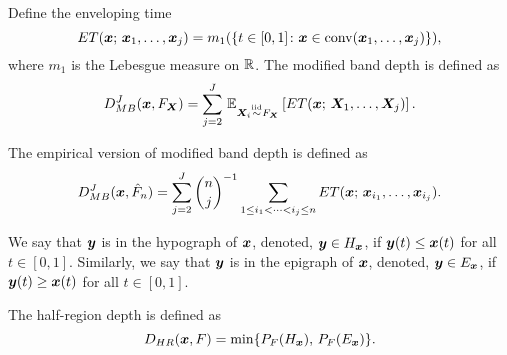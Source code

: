 \begin{definition}
    Define the enveloping time
    \begin{equation}
        ET(\bm{x};\, \bm{x}_1, \dots, \bm{x}_j) = m_1(\{t \in [0, 1]\colon \bm{x} \in \operatorname{conv}(\bm{x}_1, \dots, \bm{x}_j)\}),
    \end{equation}
    where $m_1$ is the Lebesgue measure on $\mathbb{R}$.
    The modified band depth is defined as
    \begin{equation}
        D_{MB}^J(\bm{x}, F_{\bm{X}}) = \sum_{j = 2}^J\, \operatorname{\mathbb{E}}_{\bm{X}_i \overset{\text{iid}}{\sim} F_{\bm{X}}}\left[ ET(\bm{x};\, \bm{X}_1, \dots, \bm{X}_j)\right].
    \end{equation}
\end{definition}
The empirical version of modified band depth is defined as
\begin{equation}
    D_{MB}^J(\bm{x}, \hat{F}_n) = \sum_{j = 2}^J\binom{n}{j}^{-1} \sum_{\substack{1 \leq i_1 < \dots < i_j \leq n}} ET(\bm{x};\, \bm{x}_{i_1}, \dots, \bm{x}_{i_j}).
\end{equation}


\begin{definition}
    We say that $\bm{y}$ is in the hypograph of $\bm{x}$, denoted, $\bm{y} \in
    H_{\bm{x}}$, if $\bm{y}(t) \leq \bm{x}(t)$ for all $t \in [0, 1]$.
    Similarly, we say that $\bm{y}$ is in the epigraph of $\bm{x}$, denoted, $\bm{y}
    \in E_{\bm{x}}$, if $\bm{y}(t) \geq \bm{x}(t)$ for all $t \in [0, 1]$.
\end{definition}

\begin{definition}
    The half-region depth is defined as
    \begin{equation}
        D_{HR}(\bm{x}, F) = \min\{P_F(H_{\bm{x}}),\, P_F(E_{\bm{x}})\}.
    \end{equation}
\end{definition}
